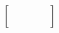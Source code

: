 \documentclass[preview]{standalone}
\begin{document}
\begin{align*}
\begin{bmatrix} \phantom{\dots \dots \dots \dots} \\ \phantom{\dots \dots \dots \dots} \\ \phantom{\dots \dots \dots \dots} \\ \phantom{\dots \dots \dots \dots} \end{bmatrix}
\end{align*}
\end{document}
